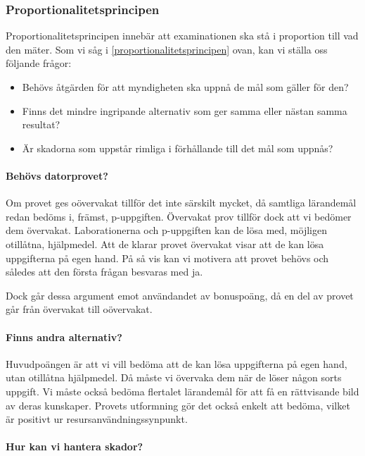 \subsubsection{Proportionalitetsprincipen}

Proportionalitetsprincipen innebär att examinationen ska stå i proportion till 
vad den mäter.
Som vi såg i \cref{proportionalitetsprincipen} ovan, kan vi ställa oss följande 
frågor:
\begin{itemize}
  \item Behövs åtgärden för att myndigheten ska uppnå de mål som gäller för 
    den?
  \item Finns det mindre ingripande alternativ som ger samma eller nästan samma
    resultat?
  \item Är skadorna som uppstår rimliga i förhållande till det mål som uppnås?
\end{itemize}

\paragraph{Behövs datorprovet?}\label{BehövsDatorprovet}

Om provet ges oövervakat tillför det inte särskilt mycket, då samtliga 
lärandemål redan bedöms i, främst, p-uppgiften.
Övervakat prov tillför dock att vi bedömer dem övervakat.
Laborationerna och p-uppgiften kan de lösa med, möjligen otillåtna, hjälpmedel.
Att de klarar provet övervakat visar att de kan lösa uppgifterna på egen hand.
På så vis kan vi motivera att provet behövs och således att den första frågan 
besvaras med ja.

Dock går dessa argument emot användandet av bonuspoäng, då en del av provet går 
från övervakat till oövervakat.

\paragraph{Finns andra alternativ?}

Huvudpoängen är att vi vill bedöma att de kan lösa uppgifterna på egen hand, 
utan otillåtna hjälpmedel.
Då måste vi övervaka dem när de löser någon sorts uppgift.
Vi måste också bedöma flertalet lärandemål för att få en rättvisande bild av 
deras kunskaper.
Provets utformning gör det också enkelt att bedöma, vilket är positivt ur 
resursanvändningssynpunkt.

\paragraph{Hur kan vi hantera skador?}

